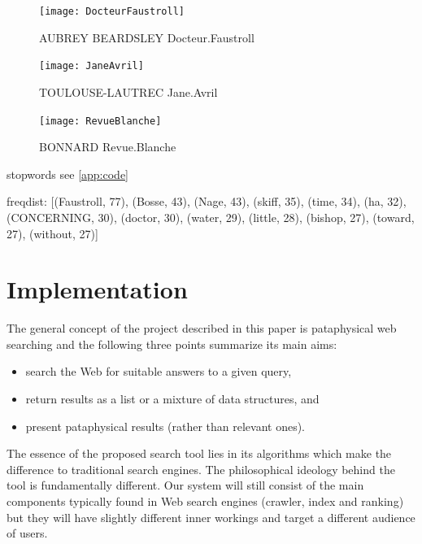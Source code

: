 \begin{figure}[htbp]
  \centering
  \texttt{[image: DocteurFaustroll]}
  \caption[AUBREY BEARDSLEY Docteur.Faustroll]{AUBREY BEARDSLEY Docteur.Faustroll}
  \label{fig:beardsley}
\end{figure}

\begin{figure}[htbp]
  \centering
  \texttt{[image: JaneAvril]}
  \caption[TOULOUSE-LAUTREC Jane.Avril]{TOULOUSE-LAUTREC Jane.Avril}
  \label{fig:toulouse}
\end{figure}

\begin{figure}[htbp]
  \centering
  \texttt{[image: RevueBlanche]}
  \caption[BONNARD Revue.Blanche]{BONNARD Revue.Blanche}
  \label{fig:bonnard}
\end{figure}




stopwords see \ref{app:code}

freqdist:
[(Faustroll, 77), (Bosse, 43), (Nage, 43), (skiff, 35), (time, 34), (ha, 32),  (CONCERNING, 30), (doctor, 30), (water, 29), (little, 28), (bishop, 27), (toward, 27), (without, 27)]





\section{Implementation}

The general concept of the project described in this paper is pataphysical web searching and the following three points summarize its main aims:

\begin{itemize}
  \item search the Web for suitable answers to a given query,
  \item return results as a list or a mixture of data structures, and
  \item present pataphysical results (rather than relevant ones).
\end{itemize}

The essence of the proposed search tool lies in its algorithms which make the difference to traditional search engines. The philosophical ideology behind the tool is fundamentally different. Our system will still consist of the main components typically found in Web search engines (crawler, index and ranking) but they will have slightly different inner workings and target a different audience of users.

